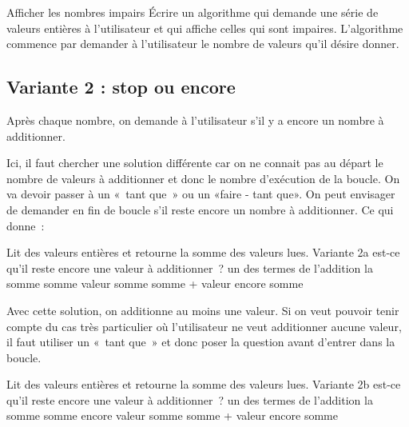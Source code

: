 		\begin{Exercice}{Afficher les nombres impairs}
			Écrire un algorithme qui demande une série
			de valeurs entières à l'utilisateur
			et qui affiche celles qui sont impaires.
			L'algorithme commence par demander à l'utilisateur
			le nombre de valeurs qu'il désire donner.
		\end{Exercice}
			
	\subsection{Variante 2 : stop ou encore}
	
		Après chaque nombre, 
		on demande à l’utilisateur s’il y a encore un nombre à additionner.

		Ici, il faut chercher une solution différente
		car on ne connait pas au départ le nombre de valeurs à additionner et
		donc le nombre d’exécution de la boucle. On va devoir passer à un
		«~tant que~» ou un «faire - tant que». On peut
		envisager de demander en fin de boucle s’il reste
		encore un nombre à additionner. Ce qui donne~:

		\begin{LDA}
		\LComment Lit des valeurs entières et retourne la somme des valeurs lues.
		 \RComment Variante 2a
			 \RComment est-ce qu’il reste encore une valeur à additionner~?
			 \RComment un des termes de l’addition
			 \RComment la somme
			\Let somme 
			\Repeat 
				\Read valeur
				\Let somme \Gets somme + valeur 
				\Read encore
			\Return somme
		\EndAlgo
		\end{LDA}
		
		Avec cette solution, on additionne au moins une valeur. 
		Si on veut pouvoir tenir compte du
		cas très particulier où l’utilisateur ne veut
		additionner aucune valeur, il faut utiliser un «~tant que~» et donc
		poser la question avant d’entrer dans la boucle.

		\begin{LDA}
		\LComment Lit des valeurs entières et retourne la somme des valeurs lues.
		 \RComment Variante 2b
			 \RComment est-ce qu’il reste encore une valeur à additionner~?
			 \RComment un des termes de l’addition
			 \RComment la somme
			\Let somme \Gets 0
			\Read encore
			\While{encore} 
				\Read valeur
				\Let somme \Gets somme + valeur 
				\Read encore
			\EndWhile
			\Return somme
		\EndAlgo
		\end{LDA}

